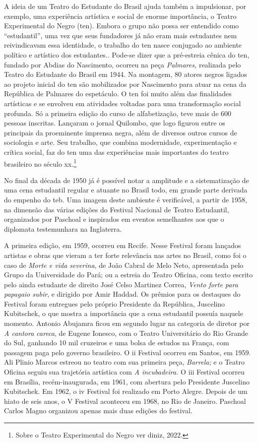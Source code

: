 A ideia de um Teatro do Estudante do Brasil ajuda também a impulsionar,
por exemplo, uma experiência artística e social de enorme importância, o
Teatro Experimental do Negro ({\sc ten}). Embora o grupo não possa ser
entendido como “estudantil”, uma vez que seus fundadores já não eram
mais estudantes nem reivindicavam essa identidade, o trabalho do {\sc ten}
nasce conjugado ao ambiente político e artístico dos estudantes..
Pode-se dizer que a pré-estreia cênica do {\sc ten}, fundado por Abdias do
Nascimento, ocorreu na peça {\it Palmares,} realizada pelo Teatro do
Estudante do Brasil em 1944. Na montagem, 80 atores negros ligados ao
projeto inicial do {\sc ten} são mobilizados por Nascimento para atuar na cena
da República de Palmares do espetáculo. O {\sc ten} foi muito além das
finalidades artísticas e se envolveu em atividades voltadas para uma
transformação social profunda. Só a primeira edição do curso de
alfabetização, teve mais de 600 pessoas inscritas. Lançaram o jornal
Quilombo, que logo figurou entre os principais da proeminente imprensa
negra, além de diversos outros cursos de sociologia e arte. Seu
trabalho, que combina modernidade, experimentação e crítica social, faz
do {\sc ten} uma das experiências mais importantes do teatro brasileiro no
século {\sc xx}.\footnote{Sobre o Teatro Experimental do Negro ver {\sc diniz},
  2022.}

No final da década de 1950 já é possível notar a amplitude e a
sistematização de uma cena estudantil regular e atuante no Brasil todo,
em grande parte derivada do empenho do {\sc teb}. Uma imagem deste ambiente é
verificável, a partir de 1958, na dimensão das várias edições do
Festival Nacional de Teatro Estudantil, organizados por Paschoal e
inspirados em eventos semelhantes aos que o diplomata testemunhara na
Inglaterra.

A primeira edição, em 1959, ocorreu em Recife. Nesse Festival foram
lançados artistas e obras que vieram a ter forte relevância nas artes no
Brasil, como foi o caso de {\it Morte e vida severina}, de João Cabral
de Melo Neto, apresentada pelo Grupo da Universidade do Pará; ou a
estreia do Teatro Oficina, com texto escrito pelo ainda estudante de
direito José Celso Martinez Correa, {\it Vento forte para papagaio
subir}, e dirigido por Amir Haddad. Os prêmios para os destaques do
Festival foram entregues pelo próprio Presidente da República, Juscelino
Kubitschek, o que mostra a importância que a cena estudantil possuía
naquele momento. Antonio Abujamra ficou em segundo lugar na categoria de
diretor por {\it A cantora careca}, de Eugene Ionesco, com o Teatro
Universitário do Rio Grande do Sul, ganhando 10 mil cruzeiros e uma
bolsa de estudos na França, com passagem paga pelo governo brasileiro. O
{\sc ii} Festival ocorreu em Santos, em 1959. Ali Plinio Marcos estreou no
teatro com sua primeira peça, {\it Barrela;} e o Teatro Oficina seguiu
sua trajetória artística com {\it A incubadeira.} O {\sc iii} Festival ocorreu
em Brasília, recém-inaugurada, em 1961, com abertura pelo Presidente
Juscelino Kubitschek. Em 1962, o {\sc iv} Festival foi realizado em Porto
Alegre. Depois de um hiato de seis anos, o V Festival aconteceu em 1968,
no Rio de Janeiro. Paschoal Carlos Magno organizou apenas mais duas
edições do festival.

